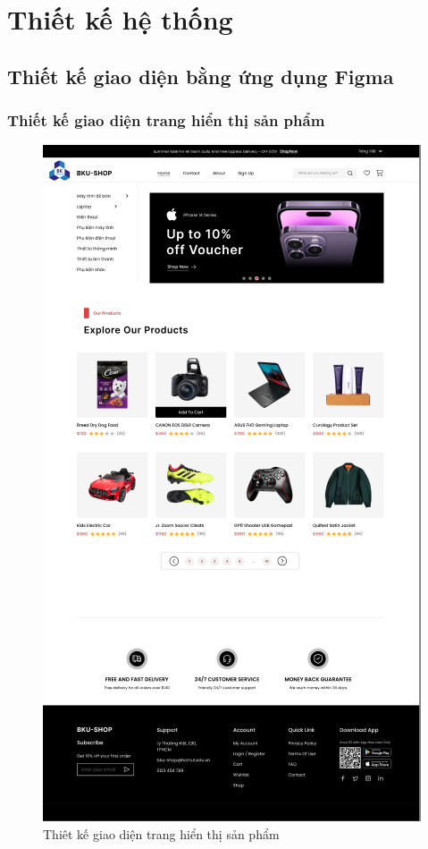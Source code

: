 \chapter{Thiết kế hệ thống}
\section{Thiết kế giao diện bằng ứng dụng Figma}
\subsection{Thiết kế giao diện trang hiển thị sản phẩm}
\begin{figure}[H]
    \begin{center}
    \includegraphics[scale=0.8]{images/hieu/chap-4/display-product-page.png}
    \vspace*{5mm}
    \caption{Thiêt kế giao diện trang hiển thị sản phẩm}
    \end{center}
\end{figure}
